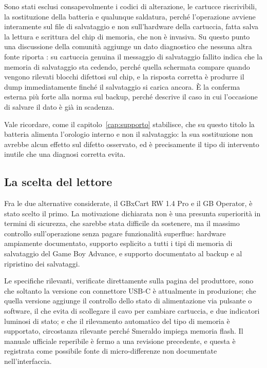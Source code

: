 Sono stati esclusi consapevolmente i codici di alterazione, le cartucce riscrivibili, la sostituzione della batteria e qualunque saldatura, perché l'operazione avviene interamente sul file di salvataggio e non sull'hardware della cartuccia, fatta salva la lettura e scrittura del chip di memoria, che non è invasiva. Su questo punto una discussione della comunità aggiunge un dato diagnostico che nessuna altra fonte riporta \cite{gbatemp-smeraldo}: su cartuccia genuina il messaggio di salvataggio fallito indica che la memoria di salvataggio sta cedendo, perché quella schermata compare quando vengono rilevati blocchi difettosi sul chip, e la risposta corretta è produrre il dump immediatamente finché il salvataggio si carica ancora. È la conferma esterna più forte alla norma sul backup, perché descrive il caso in cui l'occasione di salvare il dato è già in scadenza.

Vale ricordare, come il capitolo~\ref{cap:supporto} stabilisce, che su questo titolo la batteria alimenta l'orologio interno e non il salvataggio: la sua sostituzione non avrebbe alcun effetto sul difetto osservato, ed è precisamente il tipo di intervento inutile che una diagnosi corretta evita.

\subsection{La scelta del lettore}

Fra le due alternative considerate, il GBxCart RW 1.4 Pro e il GB Operator, è stato scelto il primo. La motivazione dichiarata non è una presunta superiorità in termini di sicurezza, che sarebbe stata difficile da sostenere, ma il massimo controllo sull'operazione senza pagare funzionalità superflue: hardware ampiamente documentato, supporto esplicito a tutti i tipi di memoria di salvataggio del Game Boy Advance, e supporto documentato al backup e al ripristino dei salvataggi.

Le specifiche rilevanti, verificate direttamente sulla pagina del produttore, sono che soltanto la versione con connettore USB-C è attualmente in produzione; che quella versione aggiunge il controllo dello stato di alimentazione via pulsante o software, il che evita di scollegare il cavo per cambiare cartuccia, e due indicatori luminosi di stato; e che il rilevamento automatico del tipo di memoria è supportato, circostanza rilevante perché Smeraldo impiega memoria flash. Il manuale ufficiale reperibile è fermo a una revisione precedente, e questa è registrata come possibile fonte di micro-differenze non documentate nell'interfaccia.

